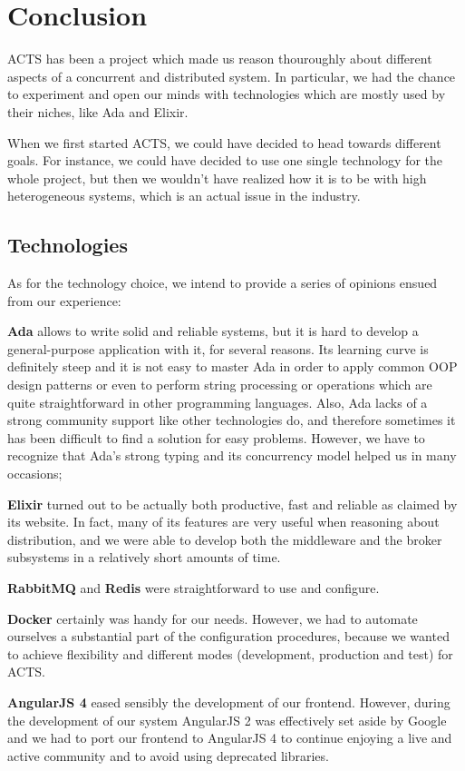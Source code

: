 \section{Conclusion}

ACTS has been a project which made us reason thouroughly about different
aspects of a concurrent and distributed system.
In particular, we had the chance to experiment and open our minds with
technologies which are mostly used by their niches, like Ada and Elixir.

When we first started ACTS, we could have decided to head towards different
goals. For instance, we could have decided to use one single technology for the
whole project, but then we wouldn't have realized how it is to be with high
heterogeneous systems, which is an actual issue in the industry.

\subsection{Technologies}

As for the technology choice, we intend to provide a series of opinions ensued
from our experience:

\noindent\textbf{Ada} allows to write solid and reliable systems, but it is
hard to develop a general-purpose application with it, for several reasons. Its
learning curve is definitely steep and it is not easy to master Ada in order
to apply common OOP design patterns or even to perform string processing or
operations which are quite straightforward in other programming languages.
Also, Ada lacks of a strong community support like other technologies do, and
therefore sometimes it has been difficult to find a solution for easy
problems. However, we have to recognize that Ada's strong typing and its
concurrency model helped us in many occasions;

\noindent\textbf{Elixir} turned out to be actually both productive, fast and
reliable as claimed by its website. In fact, many of its features are very
useful when reasoning about distribution, and we were able to develop both the
middleware and the broker subsystems in a relatively short amounts of time.

\noindent\textbf{RabbitMQ} and \textbf{Redis} were straightforward to use and
configure.

\noindent\textbf{Docker} certainly was handy for our needs. However, we had to
automate ourselves a substantial part of the configuration procedures, because
we wanted to achieve flexibility and different modes (development, production
and test) for ACTS.

\noindent\textbf{AngularJS 4} eased sensibly the development of our frontend.
However, during the development of our system AngularJS 2 was effectively set
aside by Google and we had to port our frontend to AngularJS 4 to continue
enjoying a live and active community and to avoid using deprecated libraries.

